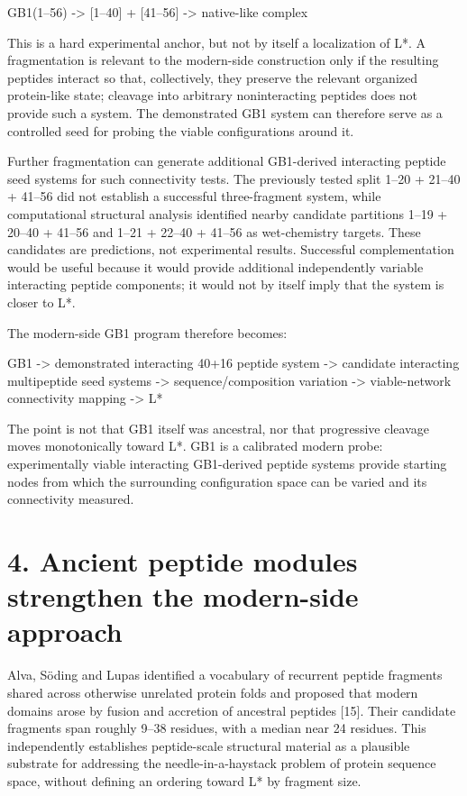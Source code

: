 \documentclass[11pt]{article}
\begin{document}
GB1(1--56) -\textgreater{} {[}1--40{]} + {[}41--56{]} -\textgreater{} native-like complex

This is a hard experimental anchor, but not by itself a localization of L*. A fragmentation is relevant to the modern-side construction only if the resulting peptides interact so that, collectively, they preserve the relevant organized protein-like state; cleavage into arbitrary noninteracting peptides does not provide such a system. The demonstrated GB1 system can therefore serve as a controlled seed for probing the viable configurations around it.

Further fragmentation can generate additional GB1-derived interacting peptide seed systems for such connectivity tests. The previously tested split 1--20 + 21--40 + 41--56 did not establish a successful three-fragment system, while computational structural analysis identified nearby candidate partitions 1--19 + 20--40 + 41--56 and 1--21 + 22--40 + 41--56 as wet-chemistry targets. These candidates are predictions, not experimental results. Successful complementation would be useful because it would provide additional independently variable interacting peptide components; it would not by itself imply that the system is closer to L*.

The modern-side GB1 program therefore becomes:

GB1 -\textgreater{} demonstrated interacting 40+16 peptide system -\textgreater{} candidate interacting multipeptide seed systems -\textgreater{} sequence/composition variation -\textgreater{} viable-network connectivity mapping -\textgreater{} L*

The point is not that GB1 itself was ancestral, nor that progressive cleavage moves monotonically toward L*. GB1 is a calibrated modern probe: experimentally viable interacting GB1-derived peptide systems provide starting nodes from which the surrounding configuration space can be varied and its connectivity measured.

\hypertarget{ancient-peptide-modules-strengthen-the-modern-side-approach}{%
\section*{4. Ancient peptide modules strengthen the modern-side approach}\label{ancient-peptide-modules-strengthen-the-modern-side-approach}}

Alva, Söding and Lupas identified a vocabulary of recurrent peptide fragments shared across otherwise unrelated protein folds and proposed that modern domains arose by fusion and accretion of ancestral peptides {[}15{]}. Their candidate fragments span roughly 9--38 residues, with a median near 24 residues. This independently establishes peptide-scale structural material as a plausible substrate for addressing the needle-in-a-haystack problem of protein sequence space, without defining an ordering toward L* by fragment size.
\end{document}
